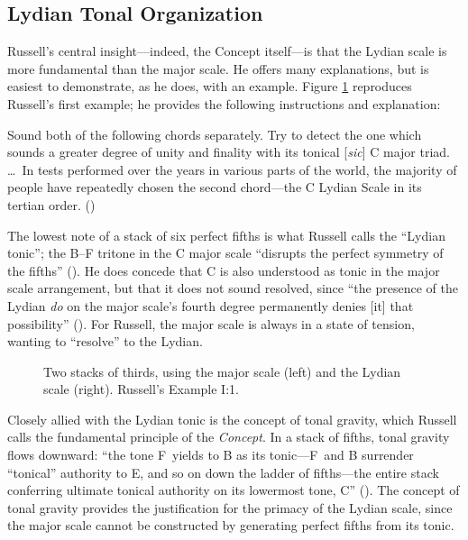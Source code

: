 \subsection{Lydian Tonal Organization}
\label{subsec:lydian-org}

Russell's central insight---indeed, the Concept itself---is that the
Lydian scale is more fundamental than the major scale. He offers many
explanations, but is easiest to demonstrate, as he does, with an example.
Figure \ref{lcc:tertian-stacks} reproduces Russell's first example; he
provides the following instructions and explanation:%
%
\begin{quoting}
  \singlespacing
  Sound both of the following chords separately. Try to detect the one which
  sounds a greater degree of unity and finality with its tonical [\emph{sic}] C
  major triad. \ldots\ In tests performed over the years in various parts of the
  world, the majority of people have repeatedly chosen the second chord---the C
  Lydian Scale in its tertian order. ()
\end{quoting}%
%
The lowest note of a stack of six perfect fifths is what Russell calls the
``Lydian tonic''; the B--F tritone in the C major scale ``disrupts the perfect
symmetry of the fifths'' (). He does concede that C is also understood as
tonic in the major scale arrangement, but that it does not sound resolved,
since ``the presence of the Lydian \emph{do} on the major scale's fourth
degree permanently denies [it] that possibility'' (). For
Russell, the major scale is always in a state of tension, wanting to
``resolve'' to the Lydian.

\begin{figure}[tbp]
  \caption[Two stacks of thirds, using the major scale and the Lydian
    scale.]{Two stacks of thirds, using the major scale (left) and the Lydian
    scale (right). Russell's Example I:1.}
  \label{lcc:tertian-stacks}
\end{figure}

Closely allied with the Lydian tonic is the concept of tonal gravity, which
Russell calls the fundamental principle of the \emph{Concept}. In a stack of
fifths, tonal gravity flows downward: ``the tone F\sharp\ yields to B as its
tonic---F\sharp\ and B surrender ``tonical'' authority to E, and so on down the
ladder of fifths---the entire stack conferring ultimate tonical authority on
its lowermost tone, C'' ().  The concept of tonal gravity provides the
justification for the primacy of the Lydian scale, since the major scale
cannot be constructed by generating perfect fifths from its tonic.

